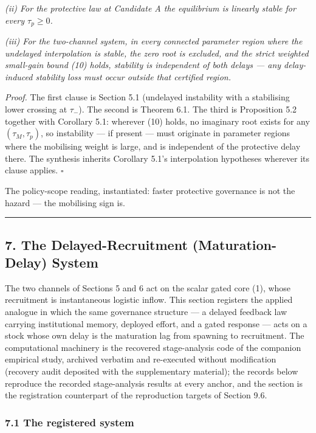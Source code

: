 \documentclass[11pt]{article}
\begin{document}
\emph{(ii) For the protective law at Candidate A the equilibrium is
linearly stable for every \(\tau_p \ge 0\).}

\emph{(iii) For the two-channel system, in every connected parameter
region where the undelayed interpolation is stable, the zero root is
excluded, and the strict weighted small-gain bound (10) holds, stability
is independent of both delays --- any delay-induced stability loss must
occur outside that certified region.}

\emph{Proof.} The first clause is Section 5.1 (undelayed instability
with a stabilising lower crossing at \(\tau_-\)). The second is Theorem
6.1. The third is Proposition 5.2 together with Corollary 5.1: wherever
(10) holds, no imaginary root exists for any \((\tau_M, \tau_p)\), so
instability --- if present --- must originate in parameter regions where
the mobilising weight is large, and is independent of the protective
delay there. The synthesis inherits Corollary 5.1's interpolation
hypotheses wherever its clause applies. \ensuremath{\square}

The policy-scope reading, instantiated: faster protective governance is
not the hazard --- the mobilising sign is.

\begin{center}\rule{0.5\linewidth}{0.5pt}\end{center}

\subsection{7. The Delayed-Recruitment (Maturation-Delay)
System}\label{the-delayed-recruitment-maturation-delay-system}

The two channels of Sections 5 and 6 act on the scalar gated core (1),
whose recruitment is instantaneous logistic inflow. This section
registers the applied analogue in which the same governance structure
--- a delayed feedback law carrying institutional memory, deployed
effort, and a gated response --- acts on a stock whose own delay is the
maturation lag from spawning to recruitment. The computational machinery
is the recovered stage-analysis code of the companion empirical study,
archived verbatim and re-executed without modification (recovery audit
deposited with the supplementary material); the records below reproduce
the recorded stage-analysis results at every anchor, and the section is
the registration counterpart of the reproduction targets of Section 9.6.

\subsubsection{7.1 The registered system}\label{the-registered-system}
\end{document}
